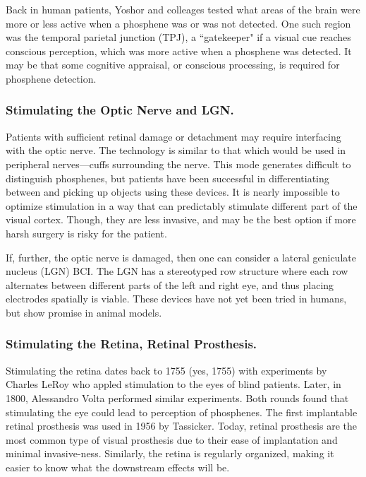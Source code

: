 Back in human patients, Yoshor and colleages tested what areas of the brain were more or less active when a phosphene was or was not detected. One such region was the temporal parietal junction (TPJ), a ``gatekeeper" if a visual cue reaches conscious perception, which was more active when a phosphene was detected. It may be that some cognitive appraisal, or conscious processing, is required for phosphene detection. 

\subsubsection{Stimulating the Optic Nerve and LGN.}

Patients with sufficient retinal damage or detachment may require interfacing with the optic nerve. The technology is similar to that which would be used in peripheral nerves---cuffs surrounding the nerve. This mode generates difficult to distinguish phosphenes, but patients have been successful in differentiating between and picking up objects using these devices. It is nearly impossible to optimize stimulation in a way that can predictably stimulate different part of the visual cortex. Though, they are less invasive, and may be the best option if more harsh surgery is risky for the patient.\newline

If, further, the optic nerve is damaged, then one can consider a lateral geniculate nucleus (LGN) BCI. The LGN has a stereotyped row structure where each row alternates between different parts of the left and right eye, and thus placing electrodes spatially is viable. These devices have not yet been tried in humans, but show promise in animal models. 


\subsubsection{Stimulating the Retina, Retinal Prosthesis.}


Stimulating the retina dates back to 1755 (yes, 1755) with experiments by Charles LeRoy who appled stimulation to the eyes of blind patients. Later, in 1800, Alessandro Volta performed similar experiments. Both rounds found that stimulating the eye could lead to perception of phosphenes. The first implantable retinal prosthesis was used in 1956 by Tassicker. Today, retinal prosthesis are the most common type of visual prosthesis due to their ease of implantation and minimal invasive-ness. Similarly, the retina is regularly organized, making it easier to know what the downstream effects will be.\newline

